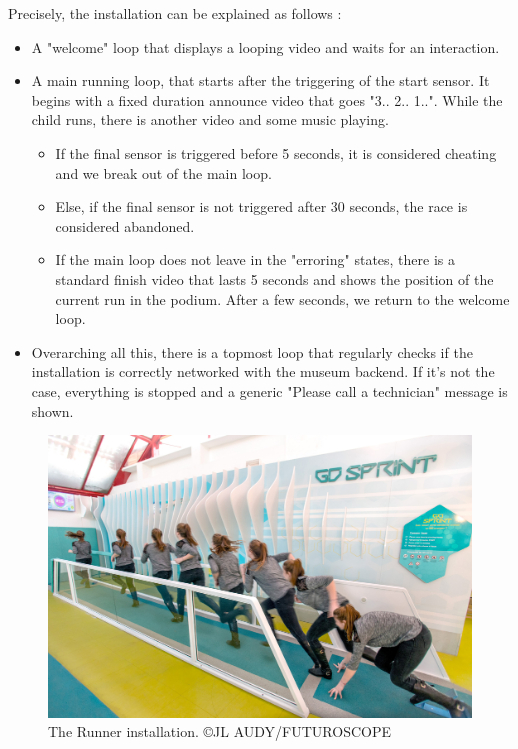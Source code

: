 \documentclass{sigchi}
\begin{document}
Precisely, the installation can be explained as follows : 
\begin{itemize}
    \item A "welcome" loop that displays a looping video and waits for an interaction.
    \item A main running loop, that starts after the triggering of the start sensor. It begins with a fixed duration announce video that goes "3.. 2.. 1..". While the child runs, there is another video and some music playing. 
    \begin{itemize}
    	\item If the final sensor is triggered before 5 seconds, it is considered cheating and we break out of the main loop.
    	
    	\item Else, if the final sensor is not triggered after 30 seconds, the race is considered abandoned. 
    	
    	\item If the main loop does not leave in the "erroring" states, there is a standard finish video that lasts 5 seconds and shows the position of the current run in the podium. After a few seconds, we return to the welcome loop.
    \end{itemize}
      
    
    \item Overarching all this, there is a topmost loop that regularly checks if the installation is correctly networked with the museum backend. If it's not the case, everything is stopped and a generic "Please call a technician" message is shown.
\end{itemize}

\begin{figure}
    \centering
    \includegraphics[scale=0.6]{images/futuroscope.jpg}
    \caption{The Runner installation. \tiny{©JL AUDY/FUTUROSCOPE}}
    \label{fig.futuroscope}
\end{figure}
\end{document}
